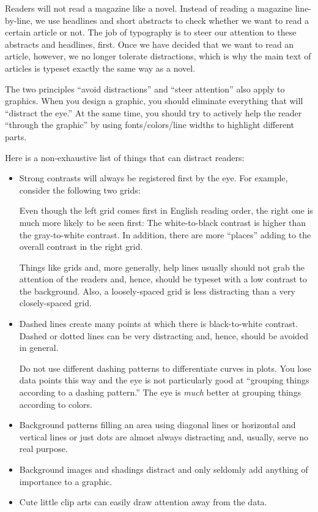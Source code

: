 Readers will not read a magazine like a novel. Instead of reading a
magazine line-by-line, we use headlines and short abstracts to check
whether we want to read a certain article or not. The job of
typography is to steer our attention to these abstracts and headlines,
first. Once we have decided that we want to read an article, however,
we no longer tolerate distractions, which is why the main text of
articles is typeset exactly the same way as a novel.

The two principles ``avoid distractions'' and ``steer attention'' also
apply to graphics. When you design a graphic, you should eliminate
everything that will ``distract the eye.'' At the same time, you
should try to actively help the reader ``through the graphic'' by
using fonts/colors/line widths to highlight different parts.

Here is a non-exhaustive list of things that can distract readers:
\begin{itemize}
\item
  Strong contrasts will always be registered first by the eye. For
  example, consider the following two grids:

  \medskip\par

  \medskip
  Even though the left grid comes first in English reading order,
  the right one is much more likely to be seen first: The
  white-to-black contrast is higher than the gray-to-white
  contrast. In addition, there are more ``places'' adding to the
  overall contrast in the right grid.

  Things like grids and, more generally, help lines usually should not
  grab the attention of the readers and, hence, should be typeset with
  a low contrast to the background. Also, a loosely-spaced grid is
  less distracting than a very closely-spaced grid.
\item
  Dashed lines create many points at which there is black-to-white
  contrast. Dashed or dotted lines can be very distracting and, hence,
  should be avoided in general.

  Do not use different dashing patterns to differentiate curves in
  plots. You lose data points this way and the eye is not
  particularly good at ``grouping things according to a dashing
  pattern.'' The eye is \emph{much} better at grouping things
  according to colors.
\item
  Background patterns filling an area using  diagonal lines or
  horizontal and vertical lines or just dots are almost always
  distracting and, usually, serve no real purpose.
\item
  Background images and shadings distract and only seldomly add
  anything of importance to a graphic.
\item
  Cute little clip arts can easily draw attention away from the
  data.
\end{itemize}
